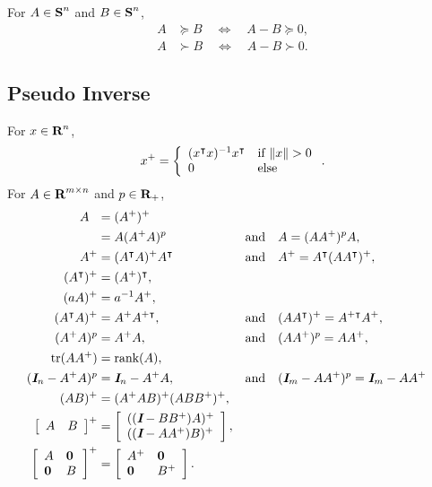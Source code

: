 \documentclass{article}
\begin{document}
    For $A\in\textbf{S}^n$ and $B\in\textbf{S}^n$,
    \begin{align*}
        A&\succeq B\quad\Leftrightarrow\quad A-B\succeq 0,\\
        A&\succ B\quad\Leftrightarrow\quad A-B\succ 0.
    \end{align*}

\clearpage
\subsection{Pseudo Inverse}

    For $x\in\textbf{R}^n$,
    \begin{align*}
        x^+ =   \left\{\arr{ 
                    (x^\tp x)^{-1} x^\tp& \text{if $\|x\|>0$} 
                    \\
                    0 &\text{else} 
                    }\right..
    \end{align*}
    For $A\in\textbf{R}^{m\times n}$ and $p\in\textbf{R}_+$,
    \begin{align*}
        A^{\phantom{+}}&=(A^+)^+\\
        &=A(A^+A)^p&&\text{and}\quad A=(AA^+)^pA,\\
        A^+&=(A^\intercal A)^+ A^\intercal&&\text{and}\quad A^+=A^\intercal(AA^\intercal)^+,\\
        (A^\intercal)^+&=(A^+)^\intercal,\\
        (aA)^+&=a^{-1}A^+,\\        
        (A^\intercal A)^+&=A^+A^{+\intercal},&&\text{and}\quad (AA^\intercal)^+=A^{+\intercal}A^+,\\
        (A^+A)^p&=A^+A,&&\text{and}\quad (AA^+)^p=AA^+,\\
        \text{tr}(AA^+)&=\text{rank}(A),\\
        (\emph{\textbf{I}}_n-A^+A)^p&=\emph{\textbf{I}}_n-A^+A,&&\text{and}\quad (\emph{\textbf{I}}_m-AA^+)^p=\emph{\textbf{I}}_m-AA^+\\
        (AB)^+&=(A^+AB)^+(ABB^+)^+,\\
        \left[\begin{array}{lllllllllllllllllll}A&B\end{array}\right]^+&=\left[\begin{array}{lllllllllllllllllll}((\emph{\textbf{I}}-BB^+)A)^+ \\ ((\emph{\textbf{I}}-AA^+)B)^+\end{array}\right],\\
        \left[\begin{array}{lllllllllllllllllll}A & \textbf{0} \\ \textbf{0} & B \end{array}\right]^+&=\left[\begin{array}{lllllllllllllllllll}A^+ & \textbf{0} \\ \textbf{0} & B^+ \end{array}\right].
    \end{align*}
\end{document}

